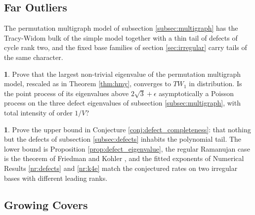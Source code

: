 \documentclass[12pt,oneside,english]{amsart}
\numberwithin{equation}{section}
\numberwithin{figure}{section}
\numberwithin{table}{section}
\theoremstyle{plain}
\numberwithin{thm}{section}
\theoremstyle{plain}
\theoremstyle{plain}
\theoremstyle{plain}
\theoremstyle{definition}
\theoremstyle{definition}
\theoremstyle{definition}
\newtheorem{problem}[thm]{\protect\problemname}
\theoremstyle{remark}
\providecommand{\problemname}{Problem}
\begin{document}
\subsection*{Far Outliers}

The permutation multigraph model of subsection \ref{subsec:multigraph}
has the Tracy-Widom bulk of the simple model together with a thin
tail of defects of cycle rank two, and the fixed base families of
section \ref{sec:irregular} carry tails of the same character.
\begin{problem}
\label{prob:multigraph}Prove that the largest non-trivial eigenvalue
of the permutation multigraph model, rescaled as in Theorem \ref{thm:hmy},
converges to $TW_{1}$ in distribution. Is the point process of its
eigenvalues above $2\sqrt{3}+\epsilon$ asymptotically a Poisson process
on the three defect eigenvalues of subsection \ref{subsec:multigraph},
with total intensity of order $1/V$?
\end{problem}

\begin{problem}
\label{prob:outlier_rate}Prove the upper bound in Conjecture \ref{conj:defect_completeness}:
that nothing but the defects of subsection \ref{subsec:defects} inhabits
the polynomial tail. The lower bound is Proposition \ref{prop:defect_eigenvalue},
the regular Ramanujan case is the theorem of Friedman and Kohler \cite{FriedmanKohler2014,FriedmanKohler2019},
and the fitted exponents of Numerical Results \ref{nr:defects} and
\ref{nr:k4e} match the conjectured rates on two irregular bases with
different leading ranks.
\end{problem}

\subsection*{Growing Covers}
\end{document}
